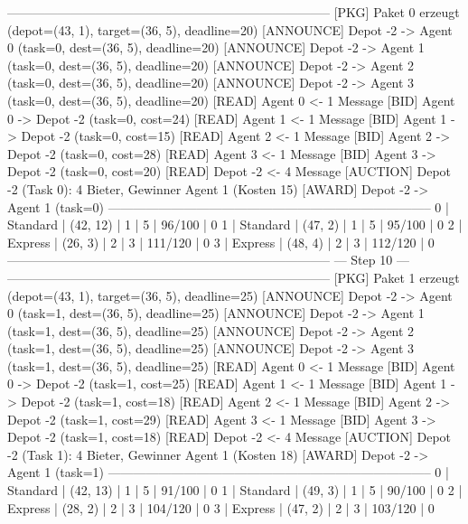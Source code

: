 -----------------------------------------------------------------------------
[PKG]      Paket 0 erzeugt (depot=(43, 1), target=(36, 5), deadline=20)
[ANNOUNCE] Depot -2 -> Agent 0 (task=0, dest=(36, 5), deadline=20)
[ANNOUNCE] Depot -2 -> Agent 1 (task=0, dest=(36, 5), deadline=20)
[ANNOUNCE] Depot -2 -> Agent 2 (task=0, dest=(36, 5), deadline=20)
[ANNOUNCE] Depot -2 -> Agent 3 (task=0, dest=(36, 5), deadline=20)
[READ]    Agent 0 <- 1 Message
[BID]      Agent 0 -> Depot -2 (task=0, cost=24)
[READ]    Agent 1 <- 1 Message
[BID]      Agent 1 -> Depot -2 (task=0, cost=15)
[READ]    Agent 2 <- 1 Message
[BID]      Agent 2 -> Depot -2 (task=0, cost=28)
[READ]    Agent 3 <- 1 Message
[BID]      Agent 3 -> Depot -2 (task=0, cost=20)
[READ]    Depot -2 <- 4 Message
[AUCTION] Depot -2 (Task 0): 4 Bieter, Gewinner Agent 1 (Kosten 15)
[AWARD]    Depot -2 -> Agent 1 (task=0)
-----------------------------------------------------------------------------
 0     | Standard  | (42, 12)    | 1       | 5          | 96/100    | 0
 1     | Standard  | (47, 2)     | 1       | 5          | 95/100    | 0
 2     | Express   | (26, 3)     | 2       | 3          | 111/120   | 0
 3     | Express   | (48, 4)     | 2       | 3          | 112/120   | 0
-----------------------------------------------------------------------------
                               --- Step 10 ---
-----------------------------------------------------------------------------
[PKG]      Paket 1 erzeugt (depot=(43, 1), target=(36, 5), deadline=25)
[ANNOUNCE] Depot -2 -> Agent 0 (task=1, dest=(36, 5), deadline=25)
[ANNOUNCE] Depot -2 -> Agent 1 (task=1, dest=(36, 5), deadline=25)
[ANNOUNCE] Depot -2 -> Agent 2 (task=1, dest=(36, 5), deadline=25)
[ANNOUNCE] Depot -2 -> Agent 3 (task=1, dest=(36, 5), deadline=25)
[READ]    Agent 0 <- 1 Message
[BID]      Agent 0 -> Depot -2 (task=1, cost=25)
[READ]    Agent 1 <- 1 Message
[BID]      Agent 1 -> Depot -2 (task=1, cost=18)
[READ]    Agent 2 <- 1 Message
[BID]      Agent 2 -> Depot -2 (task=1, cost=29)
[READ]    Agent 3 <- 1 Message
[BID]      Agent 3 -> Depot -2 (task=1, cost=18)
[READ]    Depot -2 <- 4 Message
[AUCTION] Depot -2 (Task 1): 4 Bieter, Gewinner Agent 1 (Kosten 18)
[AWARD]    Depot -2 -> Agent 1 (task=1)
-----------------------------------------------------------------------------
 0     | Standard  | (42, 13)    | 1       | 5          | 91/100    | 0
 1     | Standard  | (49, 3)     | 1       | 5          | 90/100    | 0
 2     | Express   | (28, 2)     | 2       | 3          | 104/120   | 0
 3     | Express   | (47, 2)     | 2       | 3          | 103/120   | 0
